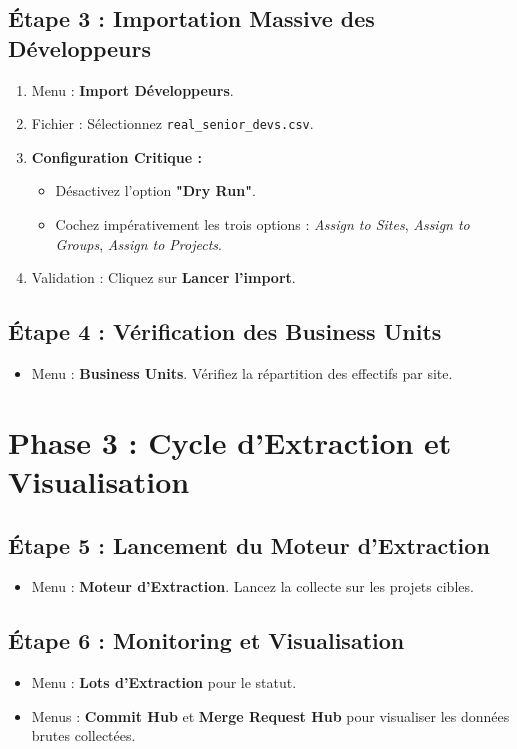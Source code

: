\documentclass[12pt,a4paper]{article}
\begin{document}
\subsection{Étape 3 : Importation Massive des Développeurs}
\begin{enumerate}
    \item Menu : \textbf{Import Développeurs}.
    \item Fichier : Sélectionnez \texttt{real\_senior\_devs.csv}.
    \item \textbf{Configuration Critique :}
    \begin{itemize}[label=\textbf{!}]
        \item Désactivez l'option \textbf{"Dry Run"}.
        \item Cochez impérativement les trois options : \textit{Assign to Sites}, \textit{Assign to Groups}, \textit{Assign to Projects}.
    \end{itemize}
    \item Validation : Cliquez sur \textbf{Lancer l'import}.
\end{enumerate}

\subsection{Étape 4 : Vérification des Business Units}
\begin{itemize}[label=\textbullet]
    \item Menu : \textbf{Business Units}. Vérifiez la répartition des effectifs par site.
\end{itemize}

\section{Phase 3 : Cycle d'Extraction et Visualisation}

\subsection{Étape 5 : Lancement du Moteur d'Extraction}
\begin{itemize}[label=\textbullet]
    \item Menu : \textbf{Moteur d'Extraction}. Lancez la collecte sur les projets cibles.
\end{itemize}

\subsection{Étape 6 : Monitoring et Visualisation}
\begin{itemize}[label=\textbullet]
    \item Menu : \textbf{Lots d'Extraction} pour le statut.
    \item Menus : \textbf{Commit Hub} et \textbf{Merge Request Hub} pour visualiser les données brutes collectées.
\end{itemize}
\end{document}
